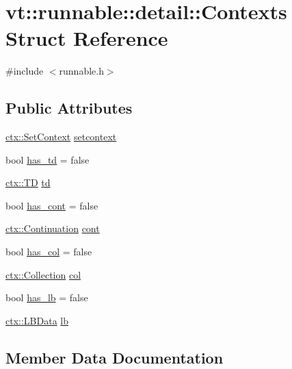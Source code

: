 \hypertarget{structvt_1_1runnable_1_1detail_1_1_contexts}{}\section{vt\+:\+:runnable\+:\+:detail\+:\+:Contexts Struct Reference}
\label{structvt_1_1runnable_1_1detail_1_1_contexts}


{\ttfamily \#include $<$runnable.\+h$>$}

\subsection*{Public Attributes}
\begin{DoxyCompactItemize}
\item 
\hyperlink{structvt_1_1ctx_1_1_set_context}{ctx\+::\+Set\+Context} \hyperlink{structvt_1_1runnable_1_1detail_1_1_contexts_ae6a78ed203ee280d9d861071968fac69}{setcontext}
\item 
bool \hyperlink{structvt_1_1runnable_1_1detail_1_1_contexts_a18a82b7cd9fbe3f5c281ff46cf030c7f}{has\+\_\+td} = false
\item 
\hyperlink{structvt_1_1ctx_1_1_t_d}{ctx\+::\+TD} \hyperlink{structvt_1_1runnable_1_1detail_1_1_contexts_a055d4227bbc6253dcfd915bf5b38cfc0}{td}
\item 
bool \hyperlink{structvt_1_1runnable_1_1detail_1_1_contexts_a002e1692c4c53d9831ad41d2c94752c4}{has\+\_\+cont} = false
\item 
\hyperlink{structvt_1_1ctx_1_1_continuation}{ctx\+::\+Continuation} \hyperlink{structvt_1_1runnable_1_1detail_1_1_contexts_a3b7c0b7e863083da1729048fbfa6d618}{cont}
\item 
bool \hyperlink{structvt_1_1runnable_1_1detail_1_1_contexts_afd010246fefe4ac608c46b3498eadabd}{has\+\_\+col} = false
\item 
\hyperlink{structvt_1_1ctx_1_1_collection}{ctx\+::\+Collection} \hyperlink{structvt_1_1runnable_1_1detail_1_1_contexts_a65702ab6d819f03e14b7d8cdae7615a4}{col}
\item 
bool \hyperlink{structvt_1_1runnable_1_1detail_1_1_contexts_ae7a56ef4e04fce37c4ae84e3077f1192}{has\+\_\+lb} = false
\item 
\hyperlink{structvt_1_1ctx_1_1_l_b_data}{ctx\+::\+L\+B\+Data} \hyperlink{structvt_1_1runnable_1_1detail_1_1_contexts_a7f951cc67fa7b10e64e54bc9170f1484}{lb}
\end{DoxyCompactItemize}


\subsection{Member Data Documentation}
\mbox{\label{structvt_1_1runnable_1_1detail_1_1_contexts_a65702ab6d819f03e14b7d8cdae7615a4}} 
